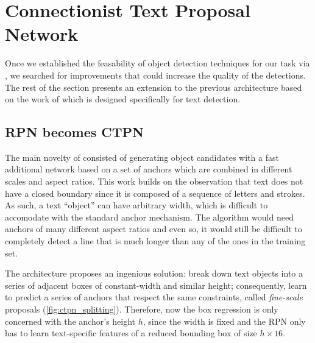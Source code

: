 
\section{Connectionist Text Proposal Network}\label{sec:ctpn}

	Once we established the feasability of object detection techniques for our task via \FRCNN{}, we searched for improvements that could increase the quality of the detections. The rest of the section presents an extension to the previous architecture based on the work of \citet{CRNN} which is designed specifically for text detection.


	\subsection{RPN becomes CTPN}
		The main novelty of \FRCNN{} consisted of generating object candidates with a fast additional network based on a set of anchors which are combined in different scales and aspect ratios. This work builds on the observation that text does not have a closed boundary since it is composed of a sequence of letters and strokes. As such, a text ``object'' can have arbitrary width, which is difficult to accomodate with the standard anchor mechanism. The algorithm would need anchors of many different aspect ratios and even so, it would still be difficult to completely detect a line that is much longer than any of the ones in the training set.

		The \CTPN{} architecture proposes an ingenious solution: break down text objects into a series of adjacent boxes of constant-width and similar height; consequently, learn to predict a series of anchors that respect the same constraints, called \emph{fine-scale} proposals (\autoref{fig:ctpn_splitting}). Therefore, now the box regression is only concerned with the anchor's height \(h\), since the width is fixed and the RPN only has to learn text-specific features of a reduced bounding box of size \(h \times 16\).

